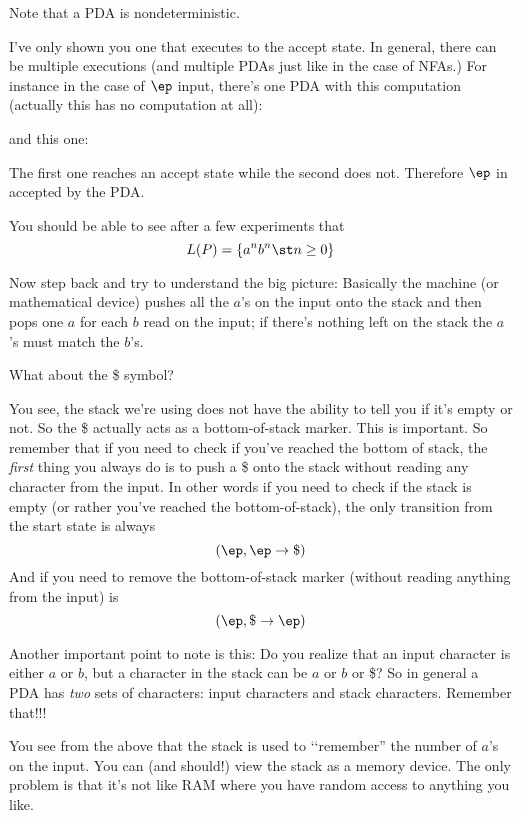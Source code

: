 Note that a PDA is nondeterministic.

I've only shown you one that executes to the accept state.
In general, there can be multiple executions (and multiple PDAs
just like in the case of NFAs.)
For instance in the case of $\ep$ input,
there's one PDA with this computation (actually this has
no computation at all):



and this one:



The first one reaches an accept state while the second does not.
Therefore $\ep$ in accepted by the PDA.

\newpage


\newpage
You should be able to see after a few experiments that
\[
L(P) = \{a^n b^n \st n \geq 0\}
\]

Now step back and try to understand the big picture:
Basically the machine (or mathematical device) pushes all the $a$'s on the
input onto the stack and then pops one $a$ for each $b$ read on the input;
if there's nothing left on the stack the $a$'s must match the $b$'s.

What about the \$ symbol?

You see, the stack we're using does not have the ability to tell you if it's
empty or not.
So the \$ actually acts as a bottom-of-stack marker.
This is important.
So remember that if you need to check if you've reached the bottom of stack,
the \textit{ first} thing you always do is to push a \$ onto the stack without
reading any character from the input.
In other words if you need to check if the stack is empty (or rather
you've reached the bottom-of-stack), the only transition from the start
state is always
\[
(\ep, \ep \rightarrow \$)
\]
And if you need to remove the bottom-of-stack marker (without reading anything
from the input) is
\[
(\ep, \$ \rightarrow \ep)
\]

Another important point to note is this:
Do you realize that an input character is either $a$ or $b$, but a character
in the stack can be $a$ or $b$ or \$?
So in general a PDA has \textit{ two} sets of characters:
input characters and stack characters.
Remember that!!!

You see from the above
that the stack is used to \lq\lq remember'' the number of $a$'s on
the input.
You can (and should!) view the stack as a memory device.
The only problem is that it's not like RAM where you have random access to
anything you like.




